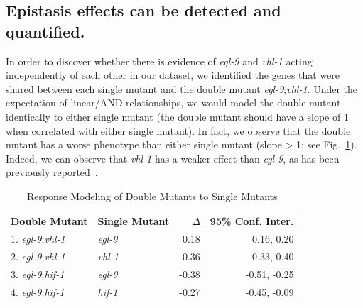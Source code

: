 \documentclass[9pt,twocolumn,twoside]{pnas-new}
\newcommand{\egl}{\emph{egl-9}}
\newcommand{\vhl}{\emph{vhl-1}}
\newcommand{\hif}{\emph{hif-1}}
\begin{document}
\subsection{Epistasis effects can be detected and quantified.}
\label{sub:Epistasis}
In order to discover whether there is evidence of \egl{} and \vhl{} acting independently of each other in our dataset, we identified the genes that were shared between each single mutant and the double mutant \egl{};\vhl{}. Under the expectation of linear/AND relationships, we would model the double mutant identically to either single mutant (the double mutant should have a slope of 1 when correlated with either single mutant). In fact, we observe that the double mutant has a worse phenotype than either single mutant (slope > 1; see Fig.~\ref{tab:double_mutant_comparison}). Indeed, we can observe that \vhl{} has a weaker effect than \egl{}, as has been previously reported~\cite{}.
\begin{table}%
\centering
\caption{Response Modeling of Double Mutants to Single Mutants}
\begin{tabular}{llrr}
Double Mutant & Single Mutant & $\Delta$ & 95\% Conf. Inter.\\
\midrule
1. \egl{};\vhl{} & \egl{} & 0.18 & 0.16, 0.20\\
2. \egl{};\vhl{} & \vhl{} & 0.36 & 0.33, 0.40\\
3. \egl{};\hif{} & \egl{} & -0.38 & -0.51, -0.25\\
4. \egl{};\hif{} & \hif{} & -0.27 & -0.45, -0.09\\
\bottomrule
\end{tabular}

\label{tab:double_mutant_comparison}
\end{table}
\end{document}
